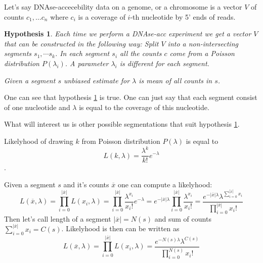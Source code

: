 \documentclass{article}
\newtheorem{hyp}{Hypothesis}
\begin{document}

Let's say DNAse-accecebility data on a genome, or a chromosome is a vector $V$ of counts $c_1, \dots c_n$
where $c_i$ is a coverage of $i$-th nucleotide by 5' ends of reads.
\begin{hyp}
    \label{hyp:main}
Each time we perform a DNAse-acc experiment we get a vector $V$ that can be constructed in the following way:
Split $V$ into a non-intersecting segments $s_1, \cdots s_k$. In each segment $s_i$ all the counts $c$ come from a Poisson distribution
    $P(\lambda_i)$. A parameter $\lambda_i$ is different for each segment.
    
    Given a segment $s$ unbiased estimate for $\lambda$ is mean of all counts in $s$.
\end{hyp}
One can see that hypothesis \ref{hyp:main} is true. One can just say that each segment consist of one nucleotide
and $\lambda$ is equal to the coverage of this nucleotide. 

What will interest us is other possible segmentations that suit hypothesis \ref{hyp:main}.

Likelyhood of drawing $k$ from Poisson distribution $P(\lambda)$ is equal to 
$$
L(k, \lambda) = \frac {\lambda^k} {k!} e^{-\lambda}
$$.

Given a segment $s$ and it's counts $\overline{x}$ one can compute a likelyhood:
$$
L(\overline{x}, \lambda) = \prod _{i=0} ^{|\overline{x}|} {L(x_i, \lambda)} = 
\prod _{i=0} ^{|\overline{x}|} \frac {\lambda^{x_i}} {x_i!} e^{-\lambda} = 
e^{-|\overline{x}|\lambda} \prod _{i=0} ^{|\overline{x}|} \frac {\lambda^{x_i}} {x_i!}  = 
\frac {e^{-|\overline{x}|\lambda} \lambda^{\sum _{i=0} ^{|\overline{x}|} x_i}} {\prod _{i=0} ^{|\overline{x}|} x_i!}
$$
Then let's call length of a segment $|\overline{x}| = N(s)$ and sum of counts $\sum _{i=0} ^{|\overline{x}|} x_i = C(s)$.
Likelyhood is then can be written as 
$$
L(\overline{x}, \lambda) = \prod _{i=0} ^{|\overline{x}|} {L(x_i, \lambda)} = 
\frac {e^{-N(s)\lambda} \lambda^{C(s)}} {\prod _{i=0} ^{N(s)} x_i!}
$$
\end{document}
